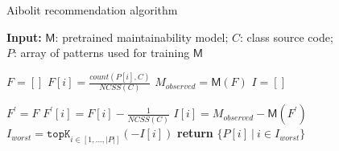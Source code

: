 \begin{algorithm}[t]
\caption{Aibolit recommendation algorithm}
\hspace{\algorithmicindent}
\textbf{Input:}  $\mathsf{M}$: pretrained
maintainability model; $C$: class source code; \\
\hspace{\algorithmicindent} $P$: array of patterns used for training $\mathsf{M}$\\

\begin{algorithmic}[1]
\State $F = [ ]$ \label{line:init_F}
\State $F[i] =\frac{\textit{count}(P[i], C)}{\textit{NCSS}(C)}$%
\EndFor \State $M_{\textit{observed}} = \mathsf{M}(F)$ \label{line:compute_m_source}
\State $I = [ ]$ \label{line:init_I}

\State $F^{\prime} = F$
\State $F^{\prime}[i] = F[i] - \frac{1}{\textit{NCSS}(C)}$ \label{line:f_prime} %
\State $I[i] = M_{\textit{observed}} - \mathsf{M}(F^{\prime})$ \label{line:impact} %
\EndFor
\State $I_{\textit{worst}} = \texttt{topK}_{i \in [1,...,|P|]} (-I[i])$ \label{line:topK}
\State \textbf{return} $\{P[i]~|~i \in I_{\textit{worst}}\}$ \label{line:return}

\end{algorithmic}
\centering
\label{fig:recsys_alg}
\end{algorithm}





